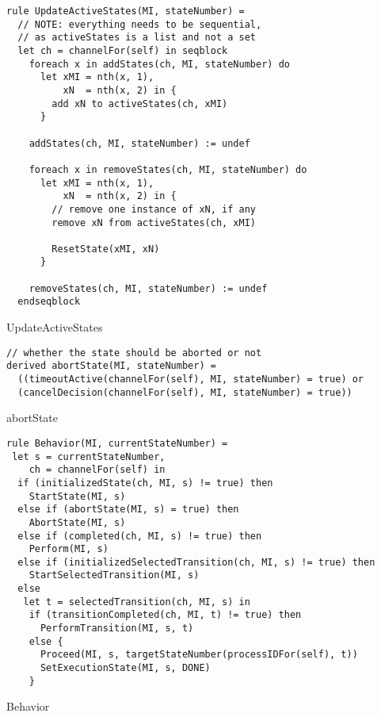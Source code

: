 \begin{listing}[H]
\begin{verbatim}
rule UpdateActiveStates(MI, stateNumber) =
  // NOTE: everything needs to be sequential,
  // as activeStates is a list and not a set
  let ch = channelFor(self) in seqblock
    foreach x in addStates(ch, MI, stateNumber) do
      let xMI = nth(x, 1),
          xN  = nth(x, 2) in {
        add xN to activeStates(ch, xMI)
      }

    addStates(ch, MI, stateNumber) := undef

    foreach x in removeStates(ch, MI, stateNumber) do
      let xMI = nth(x, 1),
          xN  = nth(x, 2) in {
        // remove one instance of xN, if any
        remove xN from activeStates(ch, xMI)

        ResetState(xMI, xN)
      }

    removeStates(ch, MI, stateNumber) := undef
  endseqblock
\end{verbatim}
\caption{UpdateActiveStates}
\label{lst:asm:UpdateActiveStates}
\end{listing}




\begin{listing}[H]
\begin{verbatim}
// whether the state should be aborted or not
derived abortState(MI, stateNumber) =
  ((timeoutActive(channelFor(self), MI, stateNumber) = true) or
  (cancelDecision(channelFor(self), MI, stateNumber) = true))
\end{verbatim}
\caption{abortState}
\label{lst:asm:abortState}
\end{listing}




\begin{listing}[H]
\begin{verbatim}
rule Behavior(MI, currentStateNumber) =
 let s = currentStateNumber,
    ch = channelFor(self) in
  if (initializedState(ch, MI, s) != true) then
    StartState(MI, s)
  else if (abortState(MI, s) = true) then
    AbortState(MI, s)
  else if (completed(ch, MI, s) != true) then
    Perform(MI, s)
  else if (initializedSelectedTransition(ch, MI, s) != true) then
    StartSelectedTransition(MI, s)
  else
   let t = selectedTransition(ch, MI, s) in
    if (transitionCompleted(ch, MI, t) != true) then
      PerformTransition(MI, s, t)
    else {
      Proceed(MI, s, targetStateNumber(processIDFor(self), t))
      SetExecutionState(MI, s, DONE)
    }
\end{verbatim}
\caption{Behavior}
\label{lst:asm:Behavior}
\end{listing}




